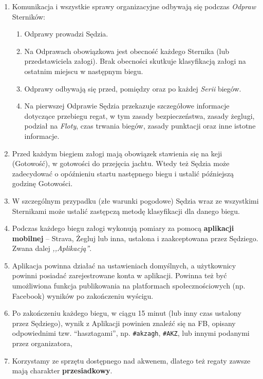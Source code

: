 \documentclass[12pt,a4paper]{article}
\begin{document}
\begin{enumerate}
\begin{enumerate}
\begin{enumerate}
            \item Floty w finale dzielą się na złotą, srebrną itd. (przyjęte nazwy: złota-,,Wilki   Morskie'', kolejne np. ,,Węże Rzeczne'', ,,Szczury Lądowe''). Liczba flot na dany rok ustalana jest na podstawie liczby Uczestników.
            \item Obowiązuje prawo drogi na wodach śródlądowych. Wszelkie odstępstwa od tego są przez Sędziego przekazywane na Odprawie.
        \end{enumerate}
    \end{enumerate}
    
    \item Komunikacja i wszystkie sprawy organizacyjne odbywają się podczas \textit{Odpraw} Sterników:
    \begin{enumerate}
        \item Odprawy prowadzi Sędzia.
        \item Na Odprawach obowiązkowa jest obecność każdego Sternika (lub przedstawiciela załogi). Brak obecności skutkuje klasyfikacją załogi na ostatnim miejscu w następnym biegu.
        \item Odprawy odbywają się przed, pomiędzy oraz po każdej \textit{Serii} biegów.
        \item Na pierwszej Odprawie Sędzia przekazuje szczegółowe informacje dotyczące przebiegu regat, w tym zasady bezpieczeństwa, zasady żeglugi, podział na \textit{Floty}, czas trwania biegów, zasady punktacji oraz inne istotne informacje.
    \end{enumerate}

    \item Przed każdym biegiem załogi mają obowiązek stawienia się na keji (Gotowość), w gotowości do przejęcia jachtu. Wtedy też Sędzia może zadecydować o opóźnieniu startu następnego biegu i ustalić późniejszą godzinę Gotowości.
    \item W szczególnym przypadku (złe warunki pogodowe) Sędzia wraz ze wszystkimi Sternikami może ustalić zastępczą metodę klasyfikacji dla danego biegu.
    \item Podczas każdego biegu załogi wykonują pomiary za pomocą \textbf{aplikacji mobilnej} -- Strava, Żegluj lub inna, ustalona i zaakceptowana przez Sędziego. Zwana dalej \textit{,,Aplikacją''}.
    \item Aplikacja powinna działać na ustawieniach domyślnych, a użytkownicy powinni posiadać zarejestrowane konta w aplikacji. Powinna też być umożliwiona funkcja publikowania na platformach społecznościowych (np. Facebook) wyników po zakończeniu wyścigu.
    \item Po zakończeniu każdego biegu, w ciągu 15 minut (lub inny czas ustalony przez Sędziego), wynik z Aplikacji powinien znaleźć się na FB, opisany odpowiednimi tzw. “hasztagami”, np. \texttt{\#akzagh}, \texttt{\#AKZ}, lub innymi podanymi przez organizatora,
    \item Korzystamy ze sprzętu dostępnego nad akwenem, dlatego też regaty zawsze mają charakter \textbf{przesiadkowy}.
\end{enumerate}
\end{document}
